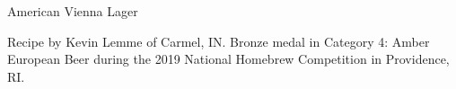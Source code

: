 \stylesection{\styleviennalager}

\begin{recipe}{American Vienna Lager}

\begin{aboutblock}
Recipe by Kevin Lemme of Carmel, IN. Bronze medal in Category 4: Amber European
Beer during the 2019 National Homebrew Competition in Providence, RI. \sourceaha
\end{aboutblock}


\begin{methodandtiming}
 
\begin{mashsteps}
\end{mashsteps}

\begin{fermentationsteps}
\end{fermentationsteps}

\end{methodandtiming}

\recipebreak

\begin{ingredientsblock}

\begin{malts}
\end{malts}

\begin{hops}
\end{hops}


\end{ingredientsblock}

\end{recipe}

